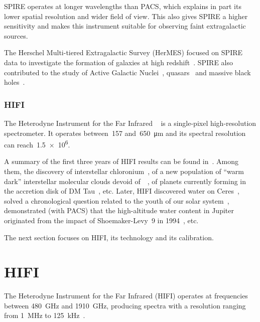 SPIRE operates at longer wavelengths than PACS, which explains in part its lower spatial resolution and wider field of view.
This also gives SPIRE a higher sensitivity and makes this instrument suitable for observing faint extragalactic sources.

The Herschel Multi-tiered Extragalactic Survey (HerMES) focused on SPIRE data to investigate the formation of galaxies at high redshift~\parencite{oliver2012herschel}.
SPIRE also contributed to the study of Active Galactic Nuclei~\parencite{hatziminaoglou2010hermes}, quasars~\parencite{bonfield2011herschel} and massive black holes~\parencite{van2010black}.

\subsubsection{HIFI}
The Heterodyne Instrument for the Far Infrared%
~\parencite{AA_537_A17}
is a single-pixel high-resolution spectrometer.
It operates between~\num{157} and~\SI{650}{\micro\meter} and its spectral resolution can reach~\num{1.5e6}.

A summary of the first three years of HIFI results can be found in~\textcite{vandertak2012first}.
Among them,
the discovery of interstellar chloronium~\parencite{lis2010herschel},
of a new population of ``warm dark'' interstellar molecular clouds devoid of~~\parencite{langer2010c+},
of planets currently forming in the accretion disk of DM Tau~\parencite{bergin2010sensitive}, etc.
Later, HIFI discovered water on Ceres~\parencite{kuppers2014localized},
solved a chronological question related to the youth of our solar system~\parencite{ceccarelli2014herschel},
demonstrated (with PACS) that the high-altitude water content in Jupiter originated from the impact of Shoemaker-Levy~9 in 1994~\parencite{cavalie2013spatial}, etc.

The next section focuses on HIFI, its technology and its calibration.



\section{HIFI}

The Heterodyne Instrument for the Far Infrared (HIFI) operates at frequencies between \SI{480}{\giga\hertz} and \SI{1910}{\giga\hertz},
producing spectra with a resolution ranging from \SI{1}{\mega\hertz} to \SI{125}{\kilo\hertz}~\parencite{AA_518_L6}.

